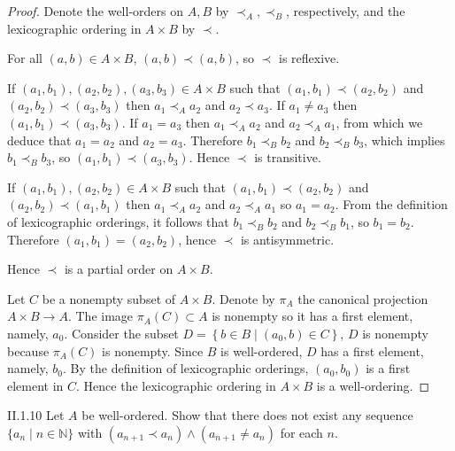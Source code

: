 \begin{proof}
	Denote the well-orders on \(A, B\) by \( \prec_{A}, \prec_{B} \), respectively, and the lexicographic ordering in \(A\times B\) by \(\prec\).

	For all \( (a, b) \in A \times B \), \( (a, b) \prec (a, b) \), so \( \prec \) is reflexive.

	If \( (a_{1}, b_{1}), (a_{2}, b_{2}), (a_{3}, b_{3}) \in A\times B \) such that \( (a_{1}, b_{1}) \prec (a_{2}, b_{2}) \) and \( (a_{2}, b_{2}) \prec (a_{3}, b_{3}) \) then \( a_{1} \prec_{A} a_{2} \) and \( a_{2} \prec a_{3} \). If \( a_{1} \ne a_{3} \) then \( (a_{1}, b_{1}) \prec (a_{3}, b_{3}) \). If \( a_{1} = a_{3} \) then \( a_{1} \prec_{A} a_{2} \) and \( a_{2} \prec_{A} a_{1} \), from which we deduce that \( a_{1} = a_{2} \) and \( a_{2} = a_{3} \). Therefore \( b_{1} \prec_{B} b_{2} \) and \( b_{2} \prec_{B} b_{3} \), which implies \( b_{1} \prec_{B} b_{3} \), so \( (a_{1}, b_{1}) \prec (a_{3}, b_{3}) \). Hence \( \prec \) is transitive.

	If \( (a_{1}, b_{1}), (a_{2}, b_{2}) \in A\times B \) such that \( (a_{1}, b_{1}) \prec (a_{2}, b_{2}) \) and \( (a_{2}, b_{2}) \prec (a_{1}, b_{1}) \) then \( a_{1} \prec_{A} a_{2} \) and \( a_{2} \prec_{A} a_{1} \) so \( a_{1} = a_{2} \). From the definition of lexicographic orderings, it follows that \( b_{1} \prec_{B} b_{2} \) and \( b_{2} \prec_{B} b_{1} \), so \( b_{1} = b_{2} \). Therefore \( (a_{1}, b_{1}) = (a_{2}, b_{2}) \), hence \( \prec \) is antisymmetric.

	Hence \( \prec \) is a partial order on \( A\times B \).

	Let \( C \) be a nonempty subset of \( A\times B \). Denote by \( \pi_{A} \) the canonical projection \( A\times B \to A \). The image \( \pi_{A}(C) \subset A \) is nonempty so it has a first element, namely, \( a_{0} \). Consider the subset \( D = \left\{ b \in B \mid (a_{0}, b) \in C \right\} \), \( D \) is nonempty because \( \pi_{A}(C) \) is nonempty. Since \( B \) is well-ordered, \( D \) has a first element, namely, \( b_{0} \). By the definition of lexicographic orderings, \( (a_{0}, b_{0}) \) is a first element in \( C \). Hence the lexicographic ordering in \( A\times B \) is a well-ordering.
\end{proof}

\begin{problem}{II.1.10}\label{problem:II.1.10}
Let \(A\) be well-ordered. Show that there does not exist any sequence \(\{a_{n} \mid n \in \mathbb{N}\}\) with \((a_{n+1} \prec a_{n}) \land (a_{n+1} \neq a_{n})\) for each \(n\).
\end{problem}


